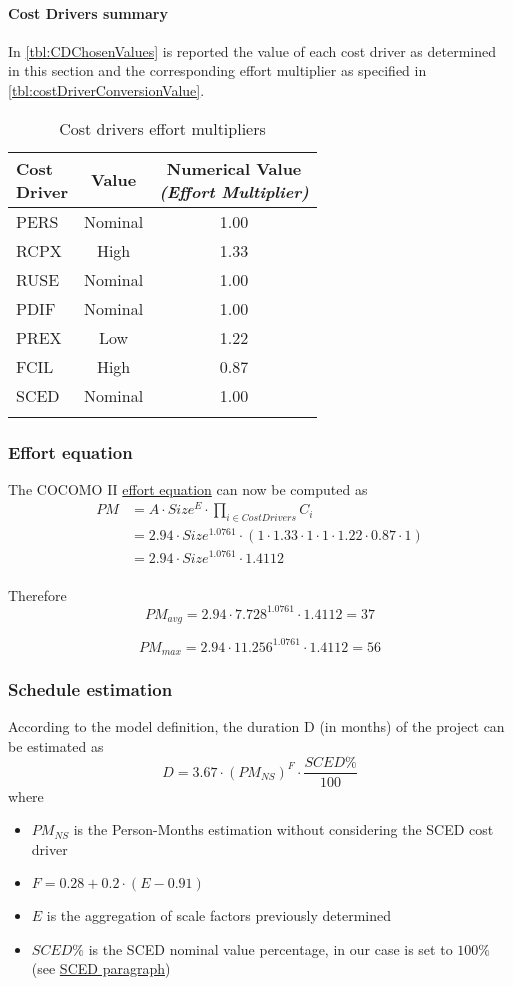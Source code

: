 \clearpage
\paragraph{Cost Drivers summary}
In \autoref{tbl:CDChosenValues} is reported the value of each cost driver as determined in this section and the corresponding effort multiplier as specified in \autoref{tbl:costDriverConversionValue}.

\begin{longtable}{lcc}
\specialcell{Cost\\Driver} & Value & \specialcell{Numerical Value\\\emph{(Effort Multiplier)}}\\
\midrule
PERS&Nominal&1.00\\
RCPX&High&1.33\\
RUSE&Nominal&1.00\\
PDIF&Nominal&1.00\\
PREX&Low&1.22\\
FCIL&High&0.87\\
SCED&Nominal&1.00\\
\bottomrule
\caption{\label{tbl:CDChosenValues}Cost drivers effort multipliers}
\end{longtable}


\subsubsection{Effort equation}
The COCOMO II \hyperref[par:cocomoEquation]{effort equation} can now be computed as
\begin{align*}
PM &= A \cdot Size^{E} \cdot \prod_{i \in CostDrivers}C_{i} \\
&= 2.94 \cdot Size^{1.0761} \cdot (1 \cdot 1.33 \cdot 1 \cdot 1 \cdot 1.22 \cdot 0.87 \cdot 1)\\
&= 2.94 \cdot Size^{1.0761} \cdot 1.4112\\
\end{align*}

Therefore
$$PM_{avg} = 2.94 \cdot 7.728^{1.0761} \cdot 1.4112 = 37$$

$$PM_{max} = 2.94 \cdot 11.256^{1.0761} \cdot 1.4112 = 56$$
\subsubsection{Schedule estimation} 
According to the model definition, the duration D (in months) of the project can be estimated as
$$D = 3.67 \cdot (PM_{NS})^F \cdot \frac{SCED\%}{100}$$
where
\begin{itemize}
	\item $PM_{NS}$ is the Person-Months estimation without considering the SCED cost driver
	\item $F = 0.28 + 0.2 \cdot (E-0.91)$
	\item $E$ is the aggregation of scale factors previously determined
	\item $SCED\%$ is the SCED nominal value percentage, in our case is set to $100\%$ (see \hyperref[par:sced]{SCED paragraph})
\end{itemize}

